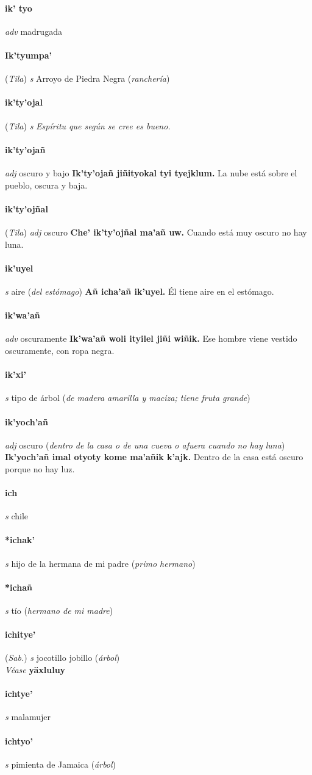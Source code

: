 \documentclass{scrbook}
\newcommand{\entry}[1]{\paragraph{#1}}
\newcommand{\nontranslationdef}[1]{\textit{#1}}
\newcommand{\partofspeech}[1]{\textit{#1}}
\newcommand{\spanishtranslation}[1]{#1}
\newcommand{\clarification}[1]{(\textit{#1})}
\newcommand{\cholexample}[1]{\textbf{#1}}
\newcommand{\exampletranslation}[1]{#1}
\newcommand{\alsosee}[1]{\\\textit{Véase} \textbf{#1}}
\newcommand{\relevantdialect}[1]{(\textit{#1})}
\begin{document}
\begin{multicols}{2}
\entry{ik' tyo}
\partofspeech{adv}
\spanishtranslation{madrugada}

\entry{Ik'tyumpa'}
\relevantdialect{Tila}
\partofspeech{s}
\spanishtranslation{Arroyo de Piedra Negra}
\clarification{ranchería}

\entry{ik'ty'ojal}
\relevantdialect{Tila}
\partofspeech{s}
\nontranslationdef{Espíritu que según se cree es bueno.}

\entry{ik'ty'ojañ}
\partofspeech{adj}
\spanishtranslation{oscuro y bajo}
\cholexample{Ik'ty'ojañ jiñityokal tyi tyejklum.}
\exampletranslation{La nube está sobre el pueblo, oscura y baja.}

\entry{ik'ty'ojñal}
\relevantdialect{Tila}
\partofspeech{adj}
\spanishtranslation{oscuro}
\cholexample{Che' ik'ty'ojñal ma'añ uw.}
\exampletranslation{Cuando está muy oscuro no hay luna.}

\entry{ik'uyel}
\partofspeech{s}
\spanishtranslation{aire}
\clarification{del estómago}
\cholexample{Añ icha'añ ik'uyel.}
\exampletranslation{Él tiene aire en el estómago.}

\entry{ik'wa'añ}
\partofspeech{adv}
\spanishtranslation{oscuramente}
\cholexample{Ik'wa'añ woli ityilel jiñi wiñik.}
\exampletranslation{Ese hombre viene vestido oscuramente, con ropa negra.}

\entry{ik'xi'}
\partofspeech{s}
\spanishtranslation{tipo de árbol}
\clarification{de madera amarilla y maciza; tiene fruta grande}

\entry{ik'yoch'añ}
\partofspeech{adj}
\spanishtranslation{oscuro}
\clarification{dentro de la casa o de una cueva o afuera cuando no hay luna}
\cholexample{Ik'yoch'añ imal otyoty kome ma'añik k'ajk.}
\exampletranslation{Dentro de la casa está oscuro porque no hay luz.}

\entry{ich}
\partofspeech{s}
\spanishtranslation{chile}

\entry{*ichak'}
\partofspeech{s}
\spanishtranslation{hijo de la hermana de mi padre}
\clarification{primo hermano}

\entry{*ichañ}
\partofspeech{s}
\spanishtranslation{tío}
\clarification{hermano de mi madre}

\entry{ichitye'}
\relevantdialect{Sab.}
\partofspeech{s}
\spanishtranslation{jocotillo}
\spanishtranslation{jobillo}
\clarification{árbol}
\alsosee{yäxluluy}

\entry{ichtye'}
\partofspeech{s}
\spanishtranslation{malamujer}

\entry{ichtyo'}
\partofspeech{s}
\spanishtranslation{pimienta de Jamaica}
\clarification{árbol}


\end{multicols}
\end{document}
